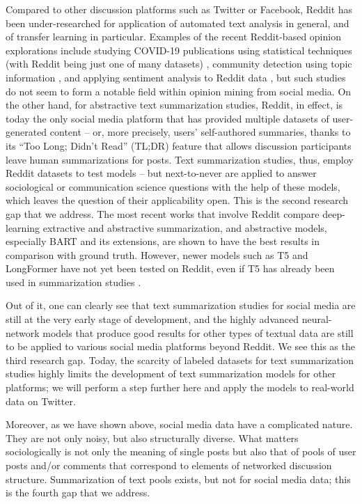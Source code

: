 Compared to other discussion platforms such as Twitter or Facebook, Reddit has been under-researched for application of automated text analysis in general, and of transfer learning in particular. Examples of the recent Reddit-based opinion explorations include studying COVID-19 publications using statistical techniques (with Reddit being just one of many datasets) \cite{KoushaThelwall}, community detection using topic information \cite{JiangSunRan}, and applying sentiment analysis to Reddit data \cite{HeYinShi}, but such studies do not seem to form a notable field within opinion mining from social media. On the other hand, for abstractive text summarization studies, Reddit, in effect, is today the only social media platform that has provided multiple datasets of user-generated content -- or, more precisely, users’ self-authored summaries, thanks to its “Too Long; Didn’t Read” (TL;DR) feature that allows discussion participants leave human summarizations for posts. Text summarization studies, thus, employ Reddit datasets to test models -- but next-to-never are applied to answer sociological or communication science questions with the help of these models, which leaves the question of their applicability open. This is the second research gap that we address. The most recent works that involve Reddit \cite{SotudehDeilamsalehyDernoncourt,LiuJiaZhu} compare deep-learning extractive and abstractive summarization, and abstractive models, especially BART and its extensions, are shown to have the best results in comparison with ground truth. However, newer models such as T5 and LongFormer have not yet been tested on Reddit, even if T5 has already been used in summarization studies \cite{ZhangZhaoSaleh}.

Out of it, one can clearly see that text summarization studies for social media are still at the very early stage of development, and the highly advanced neural-network models that produce good results for other types of textual data are still to be applied to various social media platforms beyond Reddit. We see this as the third research gap. Today, the scarcity of labeled datasets for text summarization studies highly limits the development of text summarization models for other platforms; we will perform a step further here and apply the models to real-world data on Twitter.

Moreover, as we have shown above, social media data have a complicated nature. They are not only noisy, but also structurally diverse. What matters sociologically is not only the meaning of single posts but also that of pools of user posts and/or comments that correspond to elements of networked discussion structure. Summarization of text pools exists, but not for social media data; this is the fourth gap that we address.

